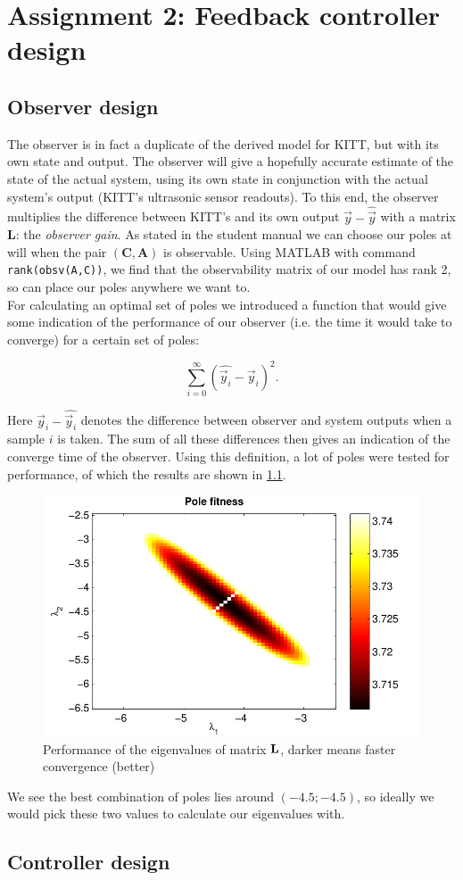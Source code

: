 \documentclass[11pt,titlepage]{report}
\begin{document}
\chapter{Assignment 2: Feedback controller design}
\section{Observer design}
The observer is in fact a duplicate of the derived model for KITT, but with its own state and output. The observer will give a hopefully accurate estimate of the state of the actual system, using its own state in conjunction with the actual system's output (KITT's ultrasonic sensor readouts). To this end, the observer multiplies the difference between KITT's and its own output $\vec{y}-\hat{\vec{y}}$ with a matrix $\mathbf{L}$: the \textit{observer gain}.
As stated in the student manual we can choose our poles at will when the pair $(\mathbf{C},\mathbf{A})$ is observable. Using MATLAB with command \texttt{rank(obsv(A,C))}, we find that the observability matrix of our model has rank \num{2}, so can place our poles anywhere we want to.
\\
For calculating an optimal set of poles we introduced a function that would give some indication of the performance of our observer (i.e. the time it would take to converge) for a certain set of poles:

\begin{equation}
	\sum_{i=0}^{\infty} (\hat{\vec{y}_i}-\vec{y}_i)^2.
\end{equation}

Here $\vec{y}_i-\hat{\vec{y}_i}$ denotes the difference between observer and system outputs when a sample $i$ is taken. The sum of all these differences then gives an indication of the converge time of the observer. Using this definition, a lot of poles were tested for performance, of which the results are shown in \ref{fig:ass2-eigs}.

\begin{figure}[H]
	\begin{center}
		\includegraphics[width=.7\linewidth]{resource/pole-fitness.pdf}
	\end{center}
	\caption{Performance of the eigenvalues of matrix $\mathbf{L}$, darker means faster convergence (better)}
	\label{fig:ass2-eigs}
\end{figure}

We see the best combination of poles lies around $(-4.5; -4.5)$, so ideally we would pick these two values to calculate our eigenvalues with.


\section{Controller design}
\end{document}
